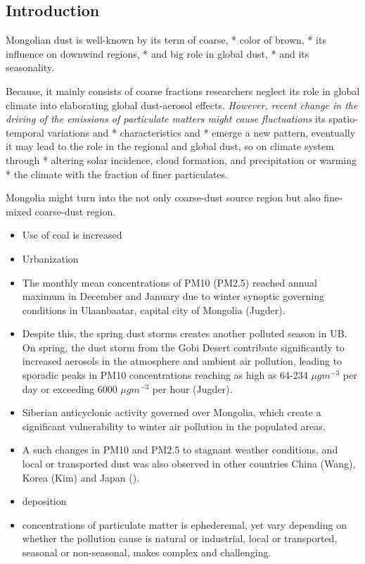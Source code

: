 \documentclass[
  11pt,
]{article}
\begin{document}
\subsection{Introduction}\label{introduction}

Mongolian dust is well-known by its term of coarse, * color of brown, *
its influence on downwind regions, * and big role in global dust, * and
its seasonality.

Because, it mainly consists of coarse fractions researchers neglect its
role in global climate into elaborating global dust-aerosol effects.
\emph{However, recent change in the driving of the emissions of
particulate matters might cause fluctuations} its spatio-temporal
variations and * characteristics and * emerge a new pattern, eventually
it may lead to the role in the regional and global dust, so on climate
system through * altering solar incidence, cloud formation, and
precipitation or warming * the climate with the fraction of finer
particulates.

Mongolia might turn into the not only coarse-dust source region but also
fine-mixed coarse-dust region.

\begin{itemize}
\item
  Use of coal is increased
\item
  Urbanization
\item
  The monthly mean concentrations of PM10 (PM2.5) reached annual maximum
  in December and January due to winter synoptic governing conditions in
  Ulaanbaatar, capital city of Mongolia (Jugder).
\item
  Despite this, the spring dust storms creates another polluted season
  in UB. On spring, the dust storm from the Gobi Desert contribute
  significantly to increased aerosols in the atmosphere and ambient air
  pollution, leading to sporadic peaks in PM10 concentrations reaching
  as high as 64-234 \(\mu g m^{-3}\) per day or exceeding 6000
  \(\mu g m^{-3}\) per hour (Jugder).
\item
  Siberian anticyclonic activity governed over Mongolia, which create a
  significant vulnerability to winter air pollution in the populated
  areas.
\item
  A such changes in PM10 and PM2.5 to stagnant weather conditions, and
  local or transported dust was also observed in other countries China
  (Wang), Korea (Kim) and Japan ().
\item
  deposition
\item
  concentrations of particulate matter is ephederemal, yet vary
  depending on whether the pollution cause is natural or industrial,
  local or transported, seasonal or non-seasonal, makes complex and
  challenging.
\end{itemize}
\end{document}

